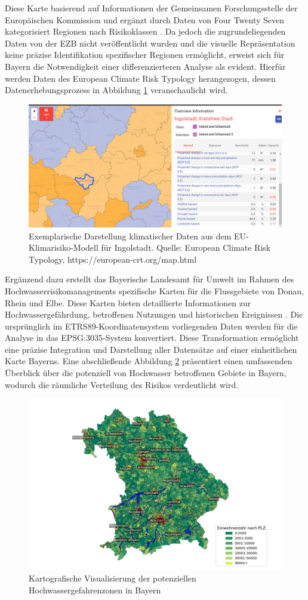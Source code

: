 Diese Karte basierend auf Informationen der Gemeinsamen Forschungsstelle der Europäischen Kommission und ergänzt durch Daten von Four Twenty Seven kategorisiert Regionen nach Risikoklassen \parencite{ECB2022ClimateStressTest}. Da jedoch die zugrundeliegenden Daten von der \ac{EZB} nicht veröffentlicht wurden und die visuelle Repräsentation keine präzise Identifikation spezifischer Regionen ermöglicht, erweist sich für Bayern die Notwendigkeit einer differenzierteren Analyse als evident. Hierfür werden Daten des European Climate Risk Typology \parencite{Carter2018} herangezogen, dessen Datenerhebungsprozess in Abbildung \ref{fig:ing} veranschaulicht wird.
\begin{figure}[htbp]
    \centering
    \includegraphics[width=\textwidth]{figures/EUclimateriskIng.png} 
    \caption{Exemplarische Darstellung klimatischer Daten aus dem EU-Klimarisiko-Modell für Ingolstadt. Quelle: European Climate Risk Typology, https://european-crt.org/map.html}
    \label{fig:ing}
\end{figure}
Ergänzend dazu erstellt das Bayerische Landesamt für Umwelt im Rahmen des Hochwasserrisikomanagements spezifische Karten für die Flussgebiete von Donau, Rhein und Elbe. Diese Karten bieten detaillierte Informationen zur Hochwassergefährdung, betroffenen Nutzungen und historischen Ereignissen \parencite{LfU_Bayern}.
Die ursprünglich im ETRS89-Koordinatensystem vorliegenden Daten werden für die Analyse in das EPSG:3035-System konvertiert. Diese Transformation ermöglicht eine präzise Integration und Darstellung aller Datensätze auf einer einheitlichen Karte Bayerns.
Eine abschließende Abbildung \ref{fig:bayernflut} präsentiert einen umfassenden Überblick über die potenziell von Hochwasser betroffenen Gebiete in Bayern, wodurch die räumliche Verteilung des Risikos verdeutlicht wird.
\begin{figure}[htbp]
    \centering
    \includegraphics[width=\textwidth]{figures/bayern_flut.png} 
    \caption{Kartografische Visualisierung der potenziellen Hochwassergefahrenzonen in Bayern}
    \label{fig:bayernflut}
\end{figure}


